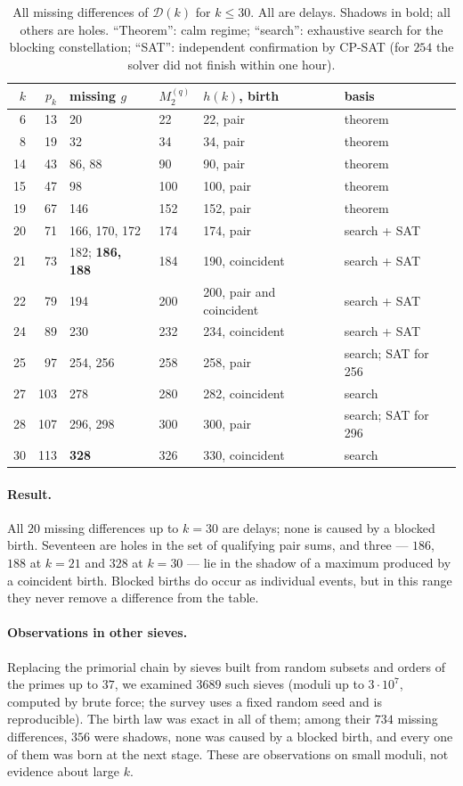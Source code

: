 \documentclass[11pt]{article}
\theoremstyle{definition}
\theoremstyle{remark}
\newcommand{\D}{\mathcal{D}}
\begin{document}
\begin{table}[ht]
\centering
\begin{tabular}{rrllll}
\toprule
$k$ & $p_k$ & missing $g$ & $M^{(q)}_2$ & $h(k)$, birth & basis \\
\midrule
6 & 13 & 20 & 22 & 22, pair & theorem \\
8 & 19 & 32 & 34 & 34, pair & theorem \\
14 & 43 & 86, 88 & 90 & 90, pair & theorem \\
15 & 47 & 98 & 100 & 100, pair & theorem \\
19 & 67 & 146 & 152 & 152, pair & theorem \\
20 & 71 & 166, 170, 172 & 174 & 174, pair & search + SAT \\
21 & 73 & 182; \textbf{186, 188} & 184 & 190, coincident & search + SAT \\
22 & 79 & 194 & 200 & 200, pair and coincident & search + SAT \\
24 & 89 & 230 & 232 & 234, coincident & search + SAT \\
25 & 97 & 254, 256 & 258 & 258, pair & search; SAT for 256 \\
27 & 103 & 278 & 280 & 282, coincident & search \\
28 & 107 & 296, 298 & 300 & 300, pair & search; SAT for 296 \\
30 & 113 & \textbf{328} & 326 & 330, coincident & search \\
\bottomrule
\end{tabular}
\caption{All missing differences of $\D(k)$ for $k \le 30$. All are delays. Shadows in bold; all others are holes. ``Theorem'': calm regime; ``search'': exhaustive search for the blocking constellation; ``SAT'': independent confirmation by CP-SAT (for $254$ the solver did not finish within one hour).}\label{tab:ziller}
\end{table}

\paragraph{Result.} All $20$ missing differences up to $k = 30$ are delays; none is caused by a blocked birth. Seventeen are holes in the set of qualifying pair sums, and three --- $186$, $188$ at $k = 21$ and $328$ at $k = 30$ --- lie in the shadow of a maximum produced by a coincident birth. Blocked births do occur as individual events, but in this range they never remove a difference from the table.

\paragraph{Observations in other sieves.} Replacing the primorial chain by sieves built from random subsets and orders of the primes up to $37$, we examined $3689$ such sieves (moduli up to $3 \cdot 10^7$, computed by brute force; the survey uses a fixed random seed and is reproducible). The birth law was exact in all of them; among their $734$ missing differences, $356$ were shadows, none was caused by a blocked birth, and every one of them was born at the next stage. These are observations on small moduli, not evidence about large $k$.
\end{document}
